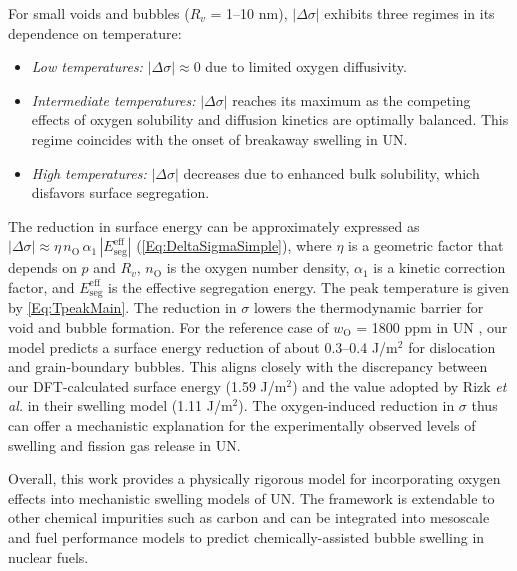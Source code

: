 \documentclass[preprint,12pt,sort&compress]{elsarticle}
\newcommand{\?}{\stackrel{?}{=}}
\begin{document}
\vspace{0.5cm}

For small voids and bubbles ($R_v$ = 1--10 nm), $|\Delta \sigma|$ exhibits three regimes in its dependence on temperature:
    \begin{itemize}
    \item \textit{Low temperatures:} $|\Delta \sigma| \approx 0$ due to limited oxygen diffusivity.
    \item \textit{Intermediate temperatures:} $|\Delta \sigma|$ reaches its maximum as the competing effects of oxygen solubility and diffusion kinetics are optimally balanced. This regime coincides with the onset of breakaway swelling in UN.
    \item \textit{High temperatures:} $|\Delta \sigma|$ decreases due to enhanced bulk solubility, which disfavors surface segregation.
    \end{itemize}

The reduction in surface energy can be approximately expressed as $|\Delta \sigma| \approx \eta \, n_\text{O} \, \alpha_1 \, |E_\text{seg}^\text{eff}|$ (\cref{Eq:DeltaSigmaSimple}), where $\eta$ is a geometric factor that depends on $p$ and $R_v$, $n_\text{O}$ is the oxygen number density, $\alpha_1$ is a kinetic correction factor, and $E_\text{seg}^\text{eff}$ is the effective segregation energy. The peak temperature is given by \cref{Eq:TpeakMain}. The reduction in $\sigma$ lowers the thermodynamic barrier for void and bubble formation. For the reference case of $w_\text{O}$ = 1800 ppm in UN \cite{Ronchi1975}, our model predicts a surface energy reduction of about 0.3--0.4 J/m$^2$ for dislocation and grain-boundary bubbles. This aligns closely with the discrepancy between our DFT-calculated surface energy (1.59 J/m$^2$) and the value adopted by Rizk \textit{et al.} \cite{Rizk2025} in their swelling model (1.11 J/m$^2$). The oxygen-induced reduction in $\sigma$ thus can offer a mechanistic explanation for the experimentally observed levels of swelling and fission gas release in UN. %

Overall, this work provides a physically rigorous model for incorporating oxygen effects into mechanistic swelling models of UN. The framework is extendable to other chemical impurities such as carbon and can be integrated into mesoscale and fuel performance models to predict chemically-assisted bubble swelling in nuclear fuels.
\end{document}
